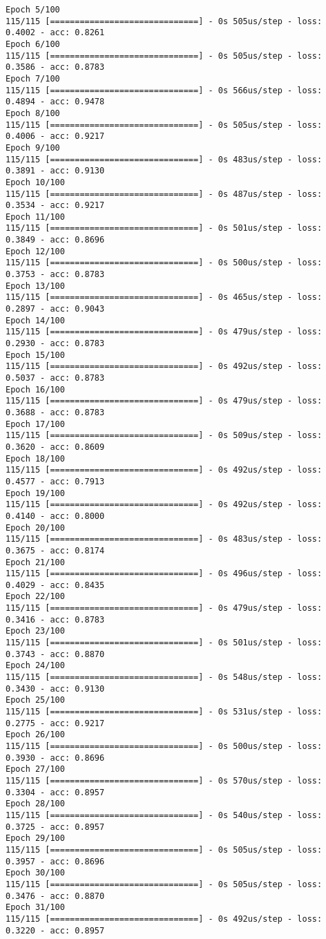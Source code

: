 \documentclass[11pt]{article}
\begin{document}
\begin{Verbatim}[commandchars=\\\{\}]
Epoch 5/100
115/115 [==============================] - 0s 505us/step - loss: 0.4002 - acc: 0.8261
Epoch 6/100
115/115 [==============================] - 0s 505us/step - loss: 0.3586 - acc: 0.8783
Epoch 7/100
115/115 [==============================] - 0s 566us/step - loss: 0.4894 - acc: 0.9478
Epoch 8/100
115/115 [==============================] - 0s 505us/step - loss: 0.4006 - acc: 0.9217
Epoch 9/100
115/115 [==============================] - 0s 483us/step - loss: 0.3891 - acc: 0.9130
Epoch 10/100
115/115 [==============================] - 0s 487us/step - loss: 0.3534 - acc: 0.9217
Epoch 11/100
115/115 [==============================] - 0s 501us/step - loss: 0.3849 - acc: 0.8696
Epoch 12/100
115/115 [==============================] - 0s 500us/step - loss: 0.3753 - acc: 0.8783
Epoch 13/100
115/115 [==============================] - 0s 465us/step - loss: 0.2897 - acc: 0.9043
Epoch 14/100
115/115 [==============================] - 0s 479us/step - loss: 0.2930 - acc: 0.8783
Epoch 15/100
115/115 [==============================] - 0s 492us/step - loss: 0.5037 - acc: 0.8783
Epoch 16/100
115/115 [==============================] - 0s 479us/step - loss: 0.3688 - acc: 0.8783
Epoch 17/100
115/115 [==============================] - 0s 509us/step - loss: 0.3620 - acc: 0.8609
Epoch 18/100
115/115 [==============================] - 0s 492us/step - loss: 0.4577 - acc: 0.7913
Epoch 19/100
115/115 [==============================] - 0s 492us/step - loss: 0.4140 - acc: 0.8000
Epoch 20/100
115/115 [==============================] - 0s 483us/step - loss: 0.3675 - acc: 0.8174
Epoch 21/100
115/115 [==============================] - 0s 496us/step - loss: 0.4029 - acc: 0.8435
Epoch 22/100
115/115 [==============================] - 0s 479us/step - loss: 0.3416 - acc: 0.8783
Epoch 23/100
115/115 [==============================] - 0s 501us/step - loss: 0.3743 - acc: 0.8870
Epoch 24/100
115/115 [==============================] - 0s 548us/step - loss: 0.3430 - acc: 0.9130
Epoch 25/100
115/115 [==============================] - 0s 531us/step - loss: 0.2775 - acc: 0.9217
Epoch 26/100
115/115 [==============================] - 0s 500us/step - loss: 0.3930 - acc: 0.8696
Epoch 27/100
115/115 [==============================] - 0s 570us/step - loss: 0.3304 - acc: 0.8957
Epoch 28/100
115/115 [==============================] - 0s 540us/step - loss: 0.3725 - acc: 0.8957
Epoch 29/100
115/115 [==============================] - 0s 505us/step - loss: 0.3957 - acc: 0.8696
Epoch 30/100
115/115 [==============================] - 0s 505us/step - loss: 0.3476 - acc: 0.8870
Epoch 31/100
115/115 [==============================] - 0s 492us/step - loss: 0.3220 - acc: 0.8957

\end{Verbatim}
\end{document}
